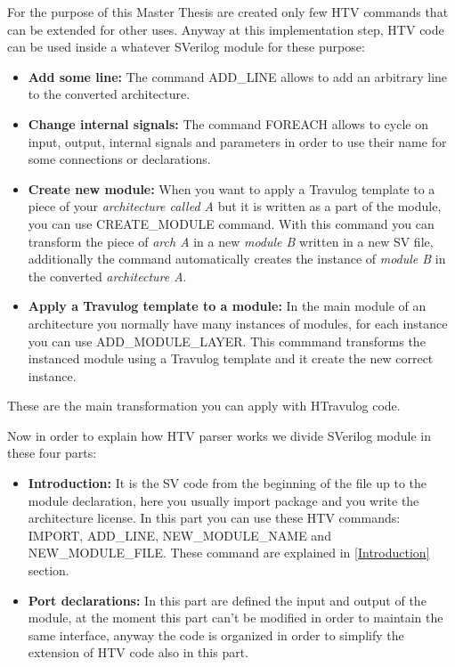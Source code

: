 {{        For the purpose of this Master Thesis are created only few HTV commands that can be extended for other uses. Anyway at this implementation step, HTV code can be used inside a whatever SVerilog module for these purpose:
        \begin{itemize}
            \item \textbf{Add some line:} The command ADD\_LINE allows to add an arbitrary line to the converted architecture.
            \item \textbf{Change internal signals:} The command FOREACH allows to cycle on input, output, internal signals and parameters in order to use their name for some connections or declarations.
            \item \textbf{Create new module:} When you want to apply a Travulog template to a piece of your \textit{architecture called A} but it is written as a part of the module, you can use CREATE\_MODULE command. With this command you can transform the piece of \textit{arch A} in a new \textit{module B} written in a new SV file, additionally the command automatically creates the instance of \textit{module B} in the converted \textit{architecture A}. 

            \item \textbf{Apply a Travulog template to a module:} In the main module of an architecture you normally have many instances of modules, for each instance you can use ADD\_MODULE\_LAYER. This commmand transforms the instanced module using a Travulog template and it create the new correct instance.
        \end{itemize}
        
        These are the main transformation you can apply with HTravulog code.
        
        Now in order to explain how HTV parser works we divide SVerilog module in these four parts:
        
        \begin{itemize}
            \item \textbf{Introduction:} It is the SV code from the beginning of the file up to the module declaration, here you usually import package and you write the architecture license. In this part you can use these HTV commands: IMPORT, ADD\_LINE, NEW\_MODULE\_NAME and  NEW\_MODULE\_FILE. These command are explained in \ref{Introduction} section.
            
            \item \textbf{Port declarations:} In this part are defined the input and output of the module, at the moment this part can't be modified in order to maintain the same interface, anyway the code is organized in order to simplify the extension of HTV code also in this part.
            

\end{itemize}}}
